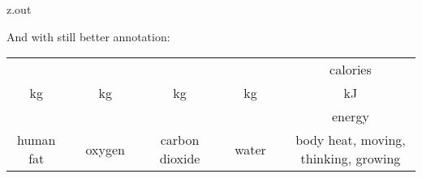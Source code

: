 \MyIOT

\begin{VerbatimOut}{z.out}

And with still better annotation:

\begin{center}
  \newcommand{\Fs}{\scriptsize}
  \begin{tabular}{@{}c@{}c@{}c@{}c@{}c@{}c@{}c@{}c@{}c@{}}
    &                                                       %
      &                                                     %
      &                                                     %
      &                                                     %
      &                                                     %
      &                                                     %
      &                                                     %
      &                                                     %
      \Fs calories\\                                        %
    \Fs kg&                                                 %
      &                                                     %
      \Fs kg&                                               %
      &                                                     %
      \Fs kg&                                               %
      &                                                     %
      \Fs kg&                                               %
      &                                                     %
      \Fs kJ\\                                              %
    \noalign{\vspace{3pt}}
    \ce{C55H104O6}                                          %
      & \ce{+}                                              %
      & \ce{78O2}                                           %
      & \ce{->}                                             %
      & \ce{55CO2}                                          %
      & \ce{+}                                              %
      & \ce{52H2O}                                          %
      & \ce{+}                                              %
      & energy\\                                            %
    \Fs human fat&                                          %
      &                                                     %
      \Fs oxygen&                                           %
      &                                                     %
      \Fs carbon dioxide&                                   %
      &                                                     %
      \Fs water&                                            %
      &                                                     %
      \Fs body heat, moving, thinking, growing\\            %
  \end{tabular}
\end{center}
\end{VerbatimOut}


